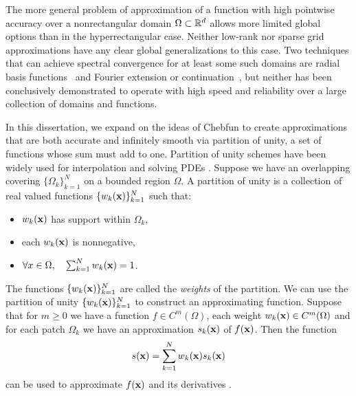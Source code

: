 The more general problem of approximation of a function with high pointwise accuracy over a nonrectangular domain $\Omega \subset \mathbb{R}^d$ allows more limited global options than in the hyperrectangular case. Neither low-rank nor sparse grid approximations have any clear global generalizations to this case. Two techniques that can achieve spectral convergence for at least some such domains are radial basis functions~\cite{Fornberg2015} and Fourier extension or continuation~\cite{adcock2014resolution}, but neither has been conclusively demonstrated to operate with high speed and reliability over a large collection of domains and functions.

In this dissertation, we expand on the ideas of Chebfun to create approximations that are both accurate and infinitely smooth via partition of unity, a set of functions whose sum must add to one. Partition of unity schemes have been widely used for interpolation \cite{franke1980smooth,mclain1976two,shepard1968two} and solving PDEs \cite{griebel2000particle,safdari2015radial}. Suppose we have an overlapping covering $\{ \Omega_k \}_{k=1}^N$ on a bounded region $\Omega$. A partition of unity is a collection of real valued functions $\{w_k(\mathbf{x)}\}_{k=1}^N$ such that:

\begin{itemize}
	\item $w_k(\mathbf{x})$ has support within $\Omega_k$,
	\item each $w_k(\mathbf{x})$ is nonnegative,
	\item $\forall x \in \Omega, \quad \sum_{k=1}^N w_k(\mathbf{x})=1$.
\end{itemize}
The functions $\{w_k(\mathbf{x})\}_{k=1}^N$ are called the \textit{weights} of the partition. We can use the partition of unity $\{w_k(\mathbf{x})\}_{k=1}^N$ to construct an approximating function. Suppose that for $m \geq 0$ we have a function $f \in C^{m}(\Omega)$, each weight $w_k(\mathbf{x})\in C^{m}(\Omega)$ and for each patch $\Omega_k$ we have an approximation $s_k(\mathbf{x})$ of $f(\mathbf{x})$. Then the function
\begin{equation}
\label{POUAPPROX}
s(\mathbf{x}) = \sum_{k=1}^N w_k(\mathbf{x})s_k(\mathbf{x})
\end{equation}
can be used to approximate $f(\mathbf{x})$ and its derivatives \cite{wendland2004scattered}.

